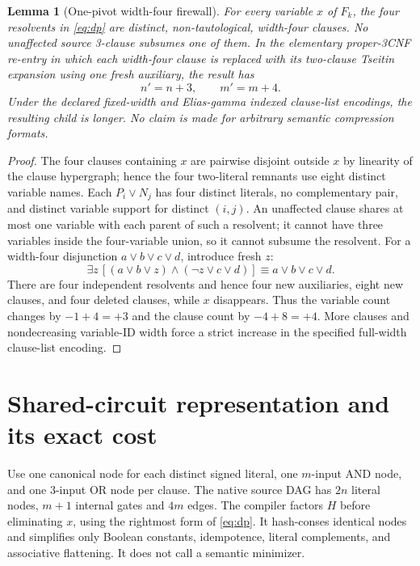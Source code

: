 \documentclass[11pt]{article}
\newtheorem{lemma}[theorem]{Lemma}
\begin{document}
\begin{lemma}[One-pivot width-four firewall]
For every variable $x$ of $F_k$, the four resolvents in \eqref{eq:dp}
are distinct, non-tautological, width-four clauses. No unaffected source
3-clause subsumes one of them. In the elementary proper-3CNF re-entry in
which each width-four clause is replaced with its two-clause Tseitin
expansion using one fresh auxiliary, the result has
\[
\boxed{n'=n+3,\qquad m'=m+4.}
\]
Under the declared fixed-width and Elias-gamma indexed clause-list
encodings, the resulting child is longer. No claim is made for arbitrary
semantic compression formats.
\end{lemma}
\begin{proof}
The four clauses containing $x$ are pairwise disjoint outside $x$ by
linearity of the clause hypergraph; hence the four two-literal remnants
use eight distinct variable names. Each $P_i\lor N_j$ has four distinct
literals, no complementary pair, and distinct variable support for distinct
$(i,j)$. An unaffected clause shares at most one variable with each
parent of such a resolvent; it cannot have three variables inside the
four-variable union, so it cannot subsume the resolvent.
For a width-four disjunction $a\lor b\lor c\lor d$, introduce fresh $z$:
\[
\exists z\,[(a\lor b\lor z)\land(\neg z\lor c\lor d)]
\equiv a\lor b\lor c\lor d.
\]
There are four independent resolvents and hence four new auxiliaries,
eight new clauses, and four deleted clauses, while $x$ disappears.
Thus the variable count changes by $-1+4=+3$ and the clause count by
$-4+8=+4$. More clauses and nondecreasing variable-ID width force a
strict increase in the specified full-width clause-list encoding.
\end{proof}

\section{Shared-circuit representation and its exact cost}
Use one canonical node for each distinct signed literal, one $m$-input
AND node, and one 3-input OR node per clause. The native source DAG has
$2n$ literal nodes, $m+1$ internal gates and $4m$ edges.
The compiler factors $H$ before eliminating $x$, using the rightmost
form of \eqref{eq:dp}. It hash-conses identical nodes and simplifies only
Boolean constants, idempotence, literal complements, and associative
flattening. It does not call a semantic minimizer.
\end{document}
